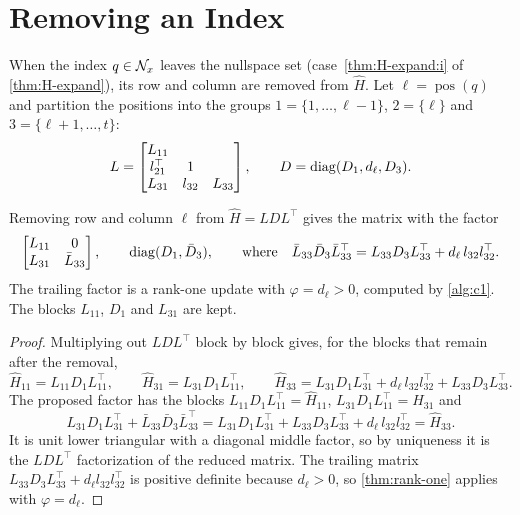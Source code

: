 \section{Removing an Index}
\label{sec:dense-delete}

When the index $q\in\mathcal{N}_x$ leaves the nullspace set (case~\ref{thm:H-expand:i} of \cref{thm:H-expand}), its row
and column are removed from $\hat H$. Let $\ell = \operatorname{pos}(q)$ and partition the
positions into the groups $1 = \{1,\dots,\ell-1\}$, $2 = \{\ell\}$ and $3 = \{\ell+1,\dots,t\}$:
\[
L = \begin{bmatrix} L_{11} & & \\ l_{21}^\top & 1 & \\ L_{31} & l_{32} & L_{33}\end{bmatrix},\qquad
D = \operatorname{diag}(D_1, d_\ell, D_3).
\]

\begin{theorem}[Delete] \label{thm:delete}
Removing row and column $\ell$ from $\hat H = LDL^\top$ gives the matrix with the factor
\[
\begin{bmatrix} L_{11} & 0\\ L_{31} & \bar L_{33}\end{bmatrix},\qquad
\operatorname{diag}(D_1, \bar D_3),\qquad\text{where}\quad
\bar L_{33}\bar D_3\bar L_{33}^\top = L_{33}D_3L_{33}^\top + d_\ell\,l_{32}l_{32}^\top .
\]
The trailing factor is a rank-one update with $\varphi = d_\ell>0$, computed by \cref{alg:c1}. The
blocks $L_{11}$, $D_1$ and $L_{31}$ are kept.
\end{theorem}

\begin{proof}
Multiplying out $LDL^\top$ block by block gives, for the blocks that remain after the removal,
\[
\hat H_{11} = L_{11}D_1L_{11}^\top,\qquad \hat H_{31} = L_{31}D_1L_{11}^\top,\qquad
\hat H_{33} = L_{31}D_1L_{31}^\top + d_\ell\,l_{32}l_{32}^\top + L_{33}D_3L_{33}^\top .
\]
The proposed factor has the blocks $L_{11}D_1L_{11}^\top = \hat H_{11}$,
$L_{31}D_1L_{11}^\top = \hat H_{31}$ and
\[
L_{31}D_1L_{31}^\top + \bar L_{33}\bar D_3\bar L_{33}^\top
= L_{31}D_1L_{31}^\top + L_{33}D_3L_{33}^\top + d_\ell\,l_{32}l_{32}^\top = \hat H_{33}.
\]
It is unit lower triangular with a diagonal middle factor, so by uniqueness it is the $LDL^\top$
factorization of the reduced matrix. The trailing matrix $L_{33}D_3L_{33}^\top + d_\ell l_{32}l_{32}^\top$
is positive definite because $d_\ell>0$, so \cref{thm:rank-one} applies with $\varphi = d_\ell$.
\end{proof}

